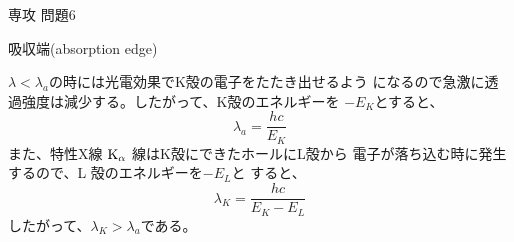 \documentclass[fleqn]{jbook}
\begin{document}
\begin{answer}{専攻 問題6}{}
\begin{subanswers}
\SubAnswer
  \begin{subsubanswers}
  \SubSubAnswer
    吸収端(absorption edge) 

  \SubSubAnswer
    $\lambda<\lambda_{a}$の時には光電効果でK殻の電子をたたき出せるよう
    になるので急激に透過強度は減少する。したがって、K殻のエネルギーを
    $-E_{K}$とすると、
%
    \[ \lambda_{a} = \frac{hc}{E_{K}} \]
%
    また、特性X線 ${\rm K}_{\alpha}$ 線はK殻にできたホールにL殻から
    電子が落ち込む時に発生するので、L 殻のエネルギーを$-E_{L}$と
    すると、
%
    \[ \lambda_{K} = \frac{hc}{E_{K}-E_{L}} \]
%
    したがって、$\lambda_{K}>\lambda_{a}$である。

  \end{subsubanswers}
\end{subanswers}
\end{answer}
\end{document}
